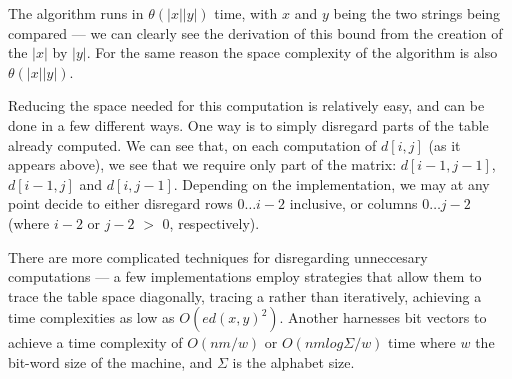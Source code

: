 \documentclass[a4paper,11pt,twoside,notitlepage]{article}
\begin{document}
        The algorithm runs in $\theta (|x||y|)$ time, with $x$ and
        $y$ being the two strings being compared --- we can clearly
        see the derivation of this bound from the creation of the
        $|x|$ by $|y|$. For the same reason the space complexity of
        the algorithm is also $\theta (|x||y|)$.

        Reducing the space needed for this computation is relatively
        easy, and can be done in a few different ways. One way is to
        simply disregard parts of the table already computed. We can
        see that, on each computation of $d[i,j]$ (as it appears
        above), we see that we require only part of the matrix:
        $d[i-1,j-1]$, $d[i-1,j]$ and $d[i,j-1]$. Depending on the
        implementation, we may at any point decide to either disregard
        rows $0 \dots i-2$ inclusive, or columns $0 \dots j-2$ (where
        $i-2$ or $j-2$ $>$ $0$, respectively). 

        There are more complicated techniques for disregarding
        unneccesary computations --- a few implementations employ
        strategies that allow them to trace the table space
        diagonally, tracing a rather than iteratively, achieving a
        time complexities as low as $O(ed(x, y)^2)$.\cite{Chang1992}
        Another harnesses bit vectors to achieve a time complexity of
        $O(nm/w)$ or $O(nm log {\Sigma}/w)$ time where $w$ the
        bit-word size of the machine, and $\Sigma$ is the alphabet
        size.\cite{Myers1999}
\end{document}
